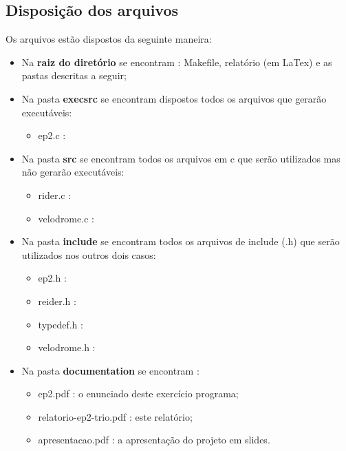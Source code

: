 \documentclass[12pt,a4paper]{article}
\begin{document}
\subsection{Disposição dos arquivos} 
	Os arquivos estão dispostos da seguinte maneira:
    \begin{itemize} %
    
    \item Na \textbf{raiz do diretório} se encontram : Makefile, relatório (em LaTex) e as pastas descritas a seguir;
    \item Na pasta \textbf{execsrc} se encontram dispostos todos os arquivos que gerarão executáveis:
    	
 	\begin{itemize} %
    \item ep2.c : %
 	\end{itemize} %
    
    \item Na pasta \textbf{src} se encontram todos os arquivos em c que serão utilizados mas não gerarão executáveis:
    
 	\begin{itemize} %
    \item rider.c : %
    \item velodrome.c : %
 	\end{itemize} %
    
    \item Na pasta \textbf{include} se encontram todos os arquivos de include (.h) que serão utilizados nos outros dois casos:
     
    \begin{itemize} %
    \item ep2.h : %
    \item reider.h : %
 	\item typedef.h : %
 	\item velodrome.h : %
 	\end{itemize} %
    
    \item Na pasta \textbf{documentation} se encontram :
    
    	\begin{itemize} %
        \item ep2.pdf : o enunciado deste exercício programa;
        \item relatorio-ep2-trio.pdf : este relatório;
        \item apresentacao.pdf : a apresentação do projeto em slides.
        \end{itemize} %
        
    \end{itemize} %
    
\end{document}
